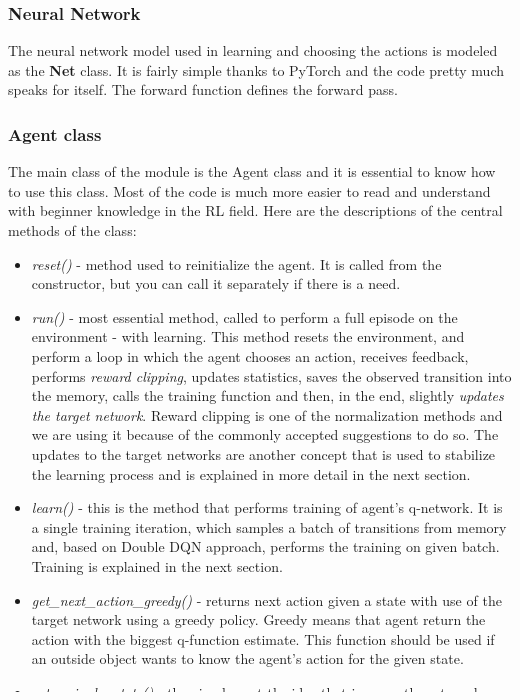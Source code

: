 \documentclass{article}
\begin{document}
\subsubsection{Neural Network}
The neural network model used in learning and choosing the actions is modeled as the \textbf{Net} class. It is fairly simple thanks to PyTorch and the code pretty much speaks for itself. The forward function defines the forward pass.

\subsubsection{Agent class}
The main class of the module is the Agent class and it is essential to know how to use this class. Most of the code is much more easier to read and understand with beginner knowledge in the RL field. Here are the descriptions of the central methods of the class:

\begin{itemize}
\item \textit{reset()} - method used to reinitialize the agent. It is called from the constructor, but you can call it separately if there is a need.
\item \textit{run()} - most essential method, called to perform a full episode on the environment - with learning. This method resets the environment, and perform a loop in which the agent chooses an action, receives feedback, performs \textit{reward clipping}, updates statistics, saves the observed transition into the memory, calls the training function and then, in the end, slightly \textit{updates the target network}. Reward clipping is one of the normalization methods and we are using it because of the commonly accepted suggestions to do so. The updates to the target networks are another concept that is used to stabilize the learning process and is explained in more detail in the next section.
\item \textit{learn()} - this is the method that performs training of agent's q-network. It is a single training iteration, which samples a batch of transitions from memory and, based on Double DQN approach, performs the training on given batch. Training is explained in the next section. 
\item \textit{get\_next\_action\_greedy()} - returns next action given a state with use of the target network using a greedy policy. Greedy means that agent return the action with the biggest q-function estimate. This function should be used if an outside object wants to know the agent's action for the given state.
\item \textit{get\_episode\_stats()} - they implement the idea that is currently not used extensively. We are using these to register counts of each action to allow external object to analyze it.
\end{itemize}
\end{document}
